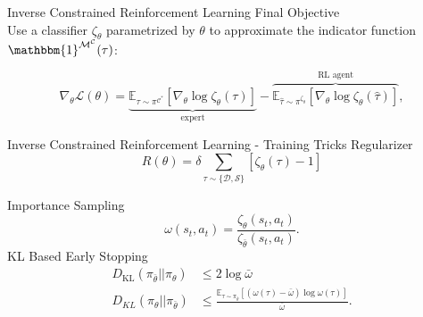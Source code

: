\documentclass[t, pdf, aspectratio=169]{beamer}
\begin{document}
\begin{frame}{Inverse Constrained Reinforcement Learning}
\vspace{10mm}
\textcolor{beamer@blendedblue}{\large{Final Objective}} \\
\vspace{2mm}
Use a classifier $\zeta_\theta$ parametrized by $\theta$ to approximate the indicator function $\mathbbm{1}^{\mathcal{M}^\mathcal{C}}(\tau)$:

\begin{equation}
   \nabla_\theta\mathcal{L}(\theta)
   = \underbrace{\mathbb{E}_{\tau \sim \pi^{\mathcal{C}^*}}\left[\nabla_\theta \log \zeta_\theta(\tau)\right]}_{\text{expert}} 
   - \overbrace{\mathbb{E}_{\hat\tau\sim\pi^{\zeta_\theta}}\left[\nabla_\theta \log \zeta_\theta(\hat{\tau})\right]}^{\text{RL agent}},
   \label{eq:grad_theta}
\end{equation}

\end{frame}


\begin{frame}{Inverse Constrained Reinforcement Learning - Training Tricks}
\renewcommand{\baselinestretch}{1.5}
\textcolor{beamer@blendedblue}{\large{Regularizer}} \\
\begin{equation}
    R(\theta) = \delta\sum_{\tau \sim \{\mathcal{D},\mathcal{S}\}}[\zeta_{\theta}(\tau)-1]
    \label{eq:reg}
\end{equation}

\textcolor{beamer@blendedblue}{\large{Importance Sampling}} \\
\begin{equation}
	\omega(s_t,a_t) = \frac{\zeta_\theta(s_t,a_t)}{\zeta_{\bar{\theta}}(s_t,a_t)}.
	\label{eq:is_weights}
\end{equation}
\textcolor{beamer@blendedblue}{\large{KL Based Early Stopping}} \\
\begin{equation}
\begin{split}
    D_\text{KL}(\pi_{\bar\theta}\vert\vert\pi_\theta) &\leq 2\log \bar\omega\\
    D_{KL}(\pi_{\theta}\vert\vert\pi_{\bar\theta}) &\leq \frac{\mathbb{E}_{\tau\sim\pi_{\bar\theta}} \left[(\omega(\tau)-\bar\omega)\log\omega(\tau)\right]}{\bar{\omega}}.
\end{split}
\end{equation}
\end{frame}

\end{document}
